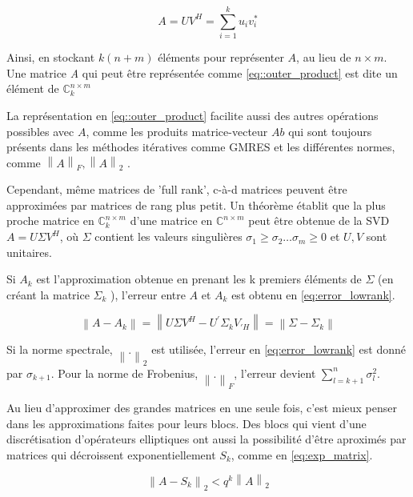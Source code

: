 \documentclass[a4paper, 15pt]{report}
\newcommand{\norm}[1]{\left\lVert#1\right\rVert}
\begin{document}
    \begin{equation}\label{eq::outer_product}
        A = UV^{H} = \sum_{i=1} ^{k} u_{i} v_{i} ^{*}
    \end{equation}

    Ainsi, en stockant $k(n+m)$ éléments pour représenter $A$, au lieu de $n\times m$. Une matrice \textit{A} qui peut être représentée comme \ref{eq::outer_product} est dite un élément de $\mathbb{C}^{n\times m}_{k}$

    La représentation en \ref{eq::outer_product} facilite aussi des autres opérations possibles avec $A$, comme les produits matrice-vecteur $Ab$ qui sont toujours présents dans les méthodes itératives comme GMRES \cite{bebendorf2008hierarchical} et les différentes normes, comme $\norm{A}_{F}, \norm{A}_{2}$ \cite{bebendorf2008hierarchical}. 

    Cependant, même matrices de 'full rank', c-à-d matrices peuvent être approximées par matrices de rang plus petit. Un théorème \cite{bebendorf2008hierarchical} établit que la plus proche matrice en $\mathbb{C}^{n\times m}_{k}$ d'une matrice en $\mathbb{C}^{n\times m}$ peut être obtenue de la SVD $A = U \Sigma V^{H}$, où $\Sigma$ contient les valeurs singulières $\sigma_{1} \geq \sigma_{2} \dots \sigma_{m} \geq 0$ et $U,V$ sont unitaires.

    Si $ A_{k} $ est l'approximation obtenue en prenant les k premiers éléments de $\Sigma$ (en créant la matrice $ \Sigma_{k} $ ), l'erreur entre $ A $ et $ A_{k} $ est obtenu en \ref{eq:error_lowrank}.

    \begin{equation}\label{eq:error_lowrank}
        \norm{A-A_{k}} = \norm{U\Sigma V^{H} - U^{'} \Sigma_{k} V_{' H}} = \norm{\Sigma - \Sigma_{k}} 
    \end{equation}

    Si la norme spectrale, $\norm{.}_{2} $ est utilisée, l'erreur en \ref{eq:error_lowrank} est donné par $\sigma_{k+1}$. Pour la norme de Frobenius, $\norm{.}_{F}$, l'erreur devient $\sum^{n}_{l=k+1} \sigma^{2}_{l}$.

    Au lieu d'approximer des grandes matrices en une seule fois, c'est mieux penser dans les approximations faites pour leurs blocs. Des blocs qui vient d'une discrétisation d'opérateurs elliptiques  ont aussi la possibilité d'être aproximés par matrices qui décroissent exponentiellement  $S_{k}$, comme en \ref{eq:exp_matrix}.

    \begin{equation}\label{eq:exp_matrix}
        \norm{A-S_{k}}_{2} < q^{k}\norm{A}_{2}
    \end{equation}
\end{document}
